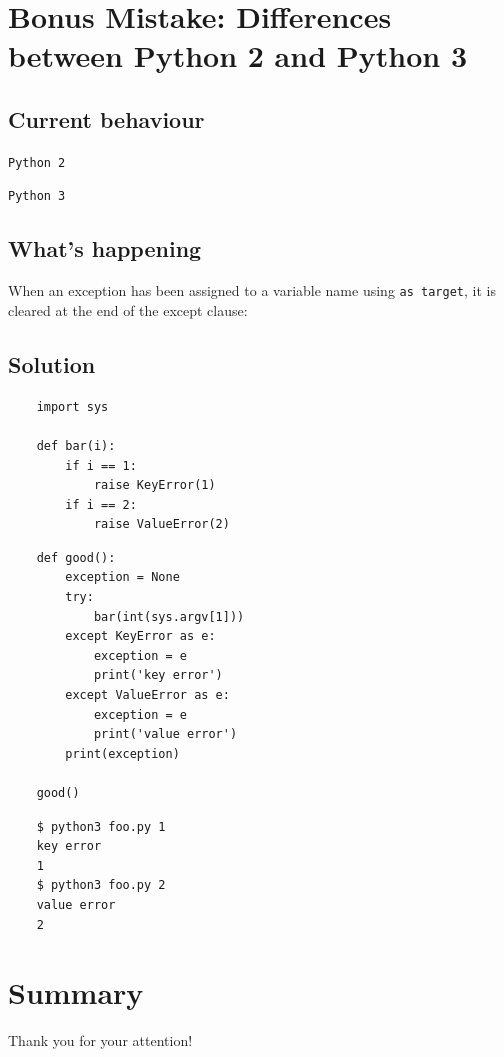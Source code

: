 \documentclass{beamer}
\begin{document}
\section{Bonus Mistake: Differences between Python 2 and Python 3}
\subsection{Current behaviour}
\begin{frame}
\begin{center}
\structure{\insertsection}
\end{center}

\end{frame}
\begin{frame}
\texttt{Python 2}

\pause \texttt{Python 3}

\end{frame}

\subsection{What's happening}
\begin{frame}
When an exception has been assigned to a variable name using \texttt{as target}, it is cleared at the end of the except clause:

\end{frame}

\subsection{Solution}
\begin{frame}[fragile]
\begin{lstlisting}
    import sys

    def bar(i):
        if i == 1:
            raise KeyError(1)
        if i == 2:
            raise ValueError(2)
\end{lstlisting}
\end{frame}
\begin{frame}[fragile]
\begin{lstlisting}
    def good():
        exception = None
        try:
            bar(int(sys.argv[1]))
        except KeyError as e:
            exception = e
            print('key error')
        except ValueError as e:
            exception = e
            print('value error')
        print(exception)

    good()
\end{lstlisting}
\pause
\begin{lstlisting}
    $ python3 foo.py 1
    key error
    1
    $ python3 foo.py 2
    value error
    2
\end{lstlisting}
\end{frame}


\section*{Summary}
\begin{frame}
\begin{center}
Thank you for your attention!
\end{center}
\end{frame}
\end{document}
